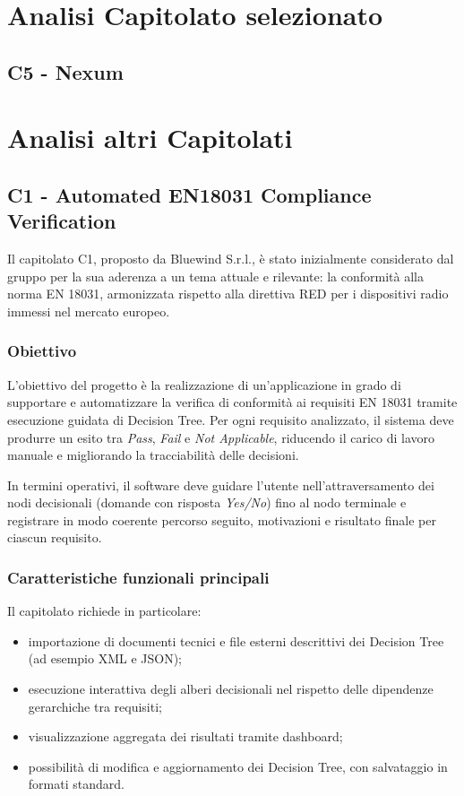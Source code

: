 \documentclass[a4paper,12pt]{article}
\begin{document}
\section{Analisi Capitolato selezionato}
\subsection{C5 - Nexum}

\section{Analisi altri Capitolati}
\subsection{C1 - Automated EN18031 Compliance Verification}

Il capitolato C1, proposto da Bluewind S.r.l., è stato inizialmente considerato dal gruppo per la sua aderenza a un tema attuale e rilevante: la conformità alla norma EN 18031, armonizzata rispetto alla direttiva RED per i dispositivi radio immessi nel mercato europeo.


\subsubsection{Obiettivo}

L'obiettivo del progetto è la realizzazione di un'applicazione in grado di supportare e automatizzare la verifica di conformità ai requisiti EN 18031 tramite esecuzione guidata di Decision Tree. Per ogni requisito analizzato, il sistema deve produrre un esito tra \textit{Pass}, \textit{Fail} e \textit{Not Applicable}, riducendo il carico di lavoro manuale e migliorando la tracciabilità delle decisioni.

In termini operativi, il software deve guidare l'utente nell'attraversamento dei nodi decisionali (domande con risposta \textit{Yes/No}) fino al nodo terminale e registrare in modo coerente percorso seguito, motivazioni e risultato finale per ciascun requisito.

\subsubsection{Caratteristiche funzionali principali}

Il capitolato richiede in particolare:

\begin{itemize}
    \item importazione di documenti tecnici e file esterni descrittivi dei Decision Tree (ad esempio XML e JSON);
    \item esecuzione interattiva degli alberi decisionali nel rispetto delle dipendenze gerarchiche tra requisiti;
    \item visualizzazione aggregata dei risultati tramite dashboard;
    \item possibilità di modifica e aggiornamento dei Decision Tree, con salvataggio in formati standard.
\end{itemize}
\end{document}
